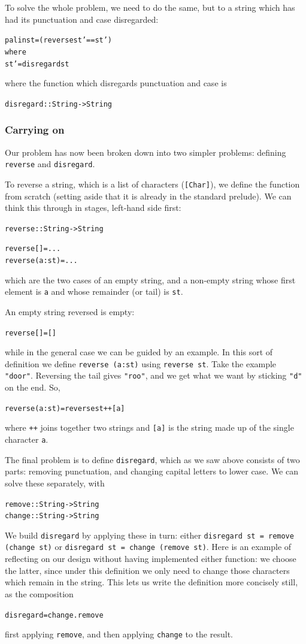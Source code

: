 To solve the whole problem, we need to do the same, but to a string which has had its punctuation and case disregarded:
\begin{alltt}
palin st = (reverse st' == st')
           where
           st' = disregard st
\end{alltt}
where the function which disregards punctuation and case is
\begin{alltt}
disregard :: String -> String
\end{alltt}

\subsubsection*{Carrying on}

Our problem has now been broken down into two simpler problems: defining \texttt{reverse} and \texttt{disregard}.

To reverse a string, which is a list of characters (\texttt{[Char]}), we define the function from scratch (setting aside that it is already in the standard prelude). We can think this through in stages, left-hand side first:
\begin{alltt}
reverse :: String -> String

reverse []     = ...
reverse (a:st) = ...
\end{alltt}
which are the two cases of an empty string, and a non-empty string whose first element is \texttt{a} and whose remainder (or tail) is \texttt{st}.

An empty string reversed is empty:
\begin{alltt}
reverse []     = []
\end{alltt}
while in the general case we can be guided by an example. In this sort of definition we define \texttt{reverse (a:st)} using \texttt{reverse st}. Take the example \texttt{"door"}. Reversing the tail gives \texttt{"roo"}, and we get what we want by sticking \texttt{"d"} on the end. So,
\begin{alltt}
reverse (a:st) = reverse st ++ [a]
\end{alltt}
where \texttt{++} joins together two strings and \texttt{[a]} is the string made up of the single character \texttt{a}.

The final problem is to define \texttt{disregard}, which as we saw above consists of two parts: removing punctuation, and changing capital letters to lower case. We can solve these separately, with
\begin{alltt}
remove :: String -> String
change :: String -> String
\end{alltt}
We build \texttt{disregard} by applying these in turn: either \texttt{disregard st = remove (change st)} or \texttt{disregard st = change (remove st)}. Here is an example of reflecting on our design without having implemented either function: we choose the latter, since under this definition we only need to change those characters which remain in the string. This lets us write the definition more concisely still, as the composition
\begin{alltt}
disregard = change . remove
\end{alltt}
first applying \texttt{remove}, and then applying \texttt{change} to the result.

